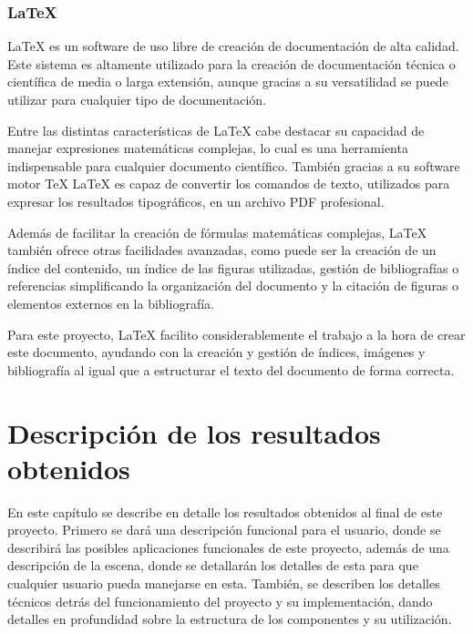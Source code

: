 \documentclass[a4paper, 12pt]{book}
\begin{document}
\subsection{LaTeX}
\label{subsec:latex}

LaTeX \cite{latexproject_about} es un software de uso libre de creación de documentación de alta calidad. Este sistema es altamente utilizado para la creación de documentación técnica o científica de media o larga extensión, aunque gracias a su versatilidad se puede utilizar para cualquier tipo de documentación.

Entre las distintas características de LaTeX cabe destacar su capacidad de manejar expresiones matemáticas complejas, lo cual es una herramienta indispensable para cualquier documento científico. También gracias a su software motor TeX LaTeX es capaz de convertir los comandos de texto, utilizados para expresar los resultados tipográficos, en un archivo PDF profesional. 

Además de facilitar la creación de fórmulas matemáticas complejas, LaTeX también ofrece otras facilidades avanzadas, como puede ser la creación de un índice del contenido, un índice de las figuras utilizadas, gestión de bibliografías o referencias simplificando la organización del documento y la citación de figuras o elementos externos en la bibliografía.

Para este proyecto, LaTeX facilito considerablemente el trabajo a la hora de crear este documento, ayudando con la creación y gestión de índices, imágenes y bibliografía al igual que a estructurar el texto del documento de forma correcta.


\cleardoublepage
\chapter{Descripción de los resultados obtenidos}
\label{chap:resultados}
En este capítulo se describe en detalle los resultados obtenidos al final de este proyecto. Primero se dará una descripción funcional para el usuario, donde se describirá las posibles aplicaciones funcionales de este proyecto, además de una descripción de la escena, donde se detallarán los detalles de esta para que cualquier usuario pueda manejarse en esta. También, se describen los detalles técnicos detrás del funcionamiento del proyecto y su implementación,
dando detalles en profundidad sobre la estructura de los componentes y su utilización.
\end{document}
